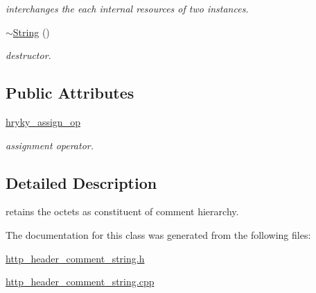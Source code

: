 \begin{DoxyCompactItemize}
\begin{DoxyCompactList}\small\item\em interchanges the each internal resources of two instances. \end{DoxyCompactList}\item 
\hypertarget{classhryky_1_1http_1_1header_1_1comment_1_1_string_a26517cc29abe8ee31a16c0570fdf786e}{\hyperlink{classhryky_1_1http_1_1header_1_1comment_1_1_string_a26517cc29abe8ee31a16c0570fdf786e}{$\sim$\-String} ()}\label{classhryky_1_1http_1_1header_1_1comment_1_1_string_a26517cc29abe8ee31a16c0570fdf786e}

\begin{DoxyCompactList}\small\item\em destructor. \end{DoxyCompactList}\end{DoxyCompactItemize}
\subsection*{Public Attributes}
\begin{DoxyCompactItemize}
\item 
\hypertarget{classhryky_1_1http_1_1header_1_1comment_1_1_string_aa6b90b498bdb77124114af53eb61e011}{\hyperlink{classhryky_1_1http_1_1header_1_1comment_1_1_string_aa6b90b498bdb77124114af53eb61e011}{hryky\-\_\-assign\-\_\-op}}\label{classhryky_1_1http_1_1header_1_1comment_1_1_string_aa6b90b498bdb77124114af53eb61e011}

\begin{DoxyCompactList}\small\item\em assignment operator. \end{DoxyCompactList}\end{DoxyCompactItemize}


\subsection{Detailed Description}
retains the octets as constituent of comment hierarchy. 

The documentation for this class was generated from the following files\-:\begin{DoxyCompactItemize}
\item 
\hyperlink{http__header__comment__string_8h}{http\-\_\-header\-\_\-comment\-\_\-string.\-h}\item 
\hyperlink{http__header__comment__string_8cpp}{http\-\_\-header\-\_\-comment\-\_\-string.\-cpp}\end{DoxyCompactItemize}
